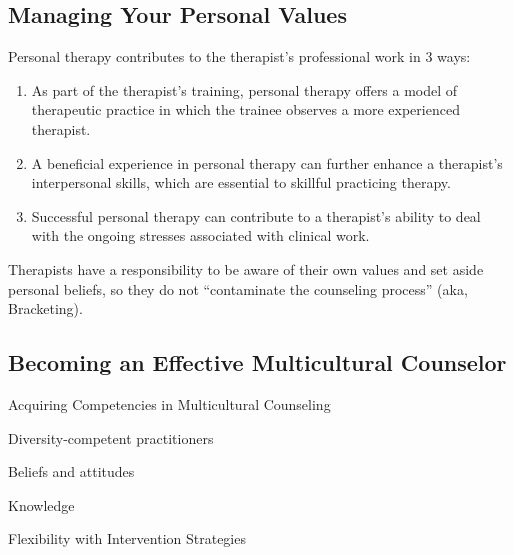 \subsection{Managing Your Personal Values}

Personal therapy contributes to the therapist's professional work in 3 ways:

\begin{enumerate}
    \item As part of the therapist's training, personal therapy offers a model of therapeutic practice in which the trainee observes a more experienced therapist.
    \item A beneficial experience in personal therapy can further enhance a therapist's interpersonal skills, which are essential to skillful practicing therapy.
    \item Successful personal therapy can contribute to a therapist's ability to deal with the ongoing stresses associated with clinical work.
\end{enumerate}

\begin{coloredlist}
    \item Therapists have a responsibility to be aware of their own values and set aside personal beliefs, so they do not ``contaminate the counseling process'' (aka, Bracketing). 
\end{coloredlist}

\subsection{Becoming an Effective Multicultural Counselor} 

\begin{coloredlist}
    \item Acquiring Competencies in Multicultural Counseling
    \begin{coloredlist}
        \item Diversity-competent practitioners
        \begin{coloredlist}
            \item Beliefs and attitudes
            \item Knowledge
            \item Flexibility with Intervention Strategies
        \end{coloredlist}
    \end{coloredlist}
\end{coloredlist}

